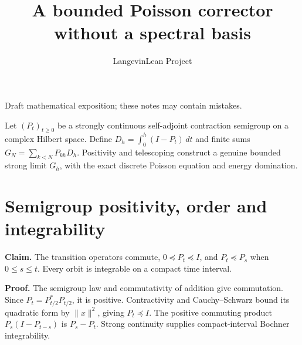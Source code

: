 \documentclass[11pt,a4paper]{article}
\title{\texorpdfstring{A bounded Poisson corrector without a spectral basis}{A bounded Poisson corrector without a spectral basis}}
\author{LangevinLean Project}
\date{}
\begin{document}
\maketitle
Draft mathematical exposition; these notes may contain mistakes.


Let \((P_t)_{t\ge0}\) be a strongly continuous self-adjoint contraction semigroup on a complex Hilbert space. Define \(D_h=\int_0^h(I-P_t)\,dt\) and finite sums \(G_N=\sum_{k<N}P_{kh}D_h\). Positivity and telescoping construct a genuine bounded strong limit \(G_h\), with the exact discrete Poisson equation and energy domination.


\section{\texorpdfstring{Semigroup positivity, order and integrability}{Semigroup positivity, order and integrability}}


\textbf{Claim.} The transition operators commute, \(0\preceq P_t\preceq I\), and \(P_t\preceq P_s\) when \(0\le s\le t\). Every orbit is integrable on a compact time interval.



\textbf{Proof.} The semigroup law and commutativity of addition give commutation. Since \(P_t=P_{t/2}^*P_{t/2}\), it is positive. Contractivity and Cauchy–Schwarz bound its quadratic form by \(\|x\|^2\), giving \(P_t\preceq I\). The positive commuting product \(P_s(I-P_{t-s})\) is \(P_s-P_t\). Strong continuity supplies compact-interval Bochner integrability.
\end{document}
